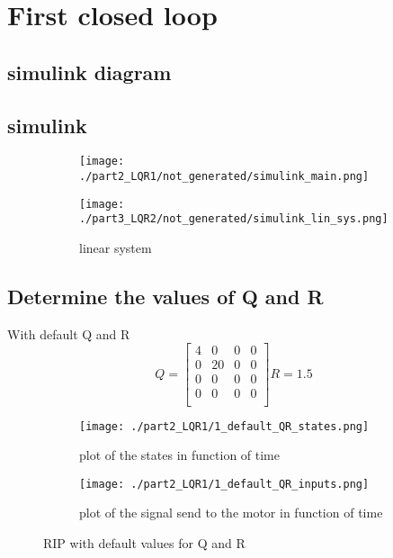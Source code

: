 \section{First closed loop}
\subsection{simulink diagram}

\subsection{simulink}
\begin{figure}[H]
	\centering
	\begin{subfigure}[b]{0.45\textwidth}
		\texttt{[image: ./part2\_LQR1/not\_generated/simulink\_main.png]}
		\caption{}
		\label{fig:main simulink part3 LQR}
	\end{subfigure}
	\begin{subfigure}[b]{0.45\textwidth}
		\texttt{[image: ./part3\_LQR2/not\_generated/simulink\_lin\_sys.png]}
		\caption{linear system}
	\end{subfigure}
	\caption{}
\end{figure}

\subsection{Determine the values of Q and R}
With default Q and R
$$
Q=\begin{bmatrix}
4 & 0 & 0 & 0 \\
0 & 20 & 0 & 0 \\
0 & 0 & 0 & 0 \\
0 & 0 & 0 & 0 \\
\end{bmatrix}
R=1.5
$$
\begin{figure}[H]
	\centering
	\begin{subfigure}[b]{0.45\textwidth}
		\texttt{[image: ./part2\_LQR1/1\_default\_QR\_states.png]}
		\caption{plot of the states in function of time}
	\end{subfigure}
	\begin{subfigure}[b]{0.45\textwidth}
		\texttt{[image: ./part2\_LQR1/1\_default\_QR\_inputs.png]}
		\caption{plot of the signal send to the motor in function of time}
	\end{subfigure}
	\caption{RIP with default values for Q and R}
	\label{fig:default}
\end{figure}

